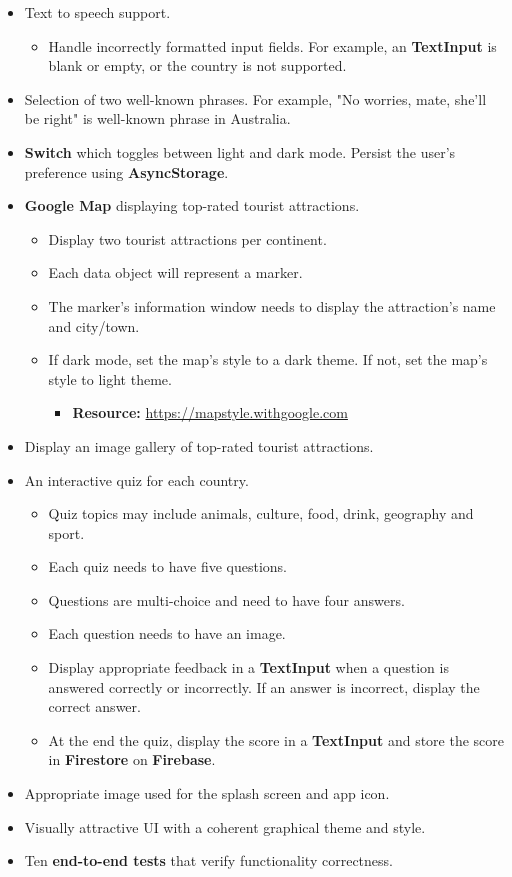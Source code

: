 \documentclass{article}
\begin{document}
\begin{itemize}
\begin{itemize}
		\end{itemize}
	\item Text to speech support.
		\begin{itemize}
			\item Handle incorrectly formatted input fields. For example, an \textbf{TextInput} is blank or empty, or the country is not supported.
		\end{itemize}
	\item Selection of two well-known phrases. For example, "No worries, mate, she'll be right" is well-known phrase in Australia.
	\item \textbf{Switch} which toggles between light and dark mode. Persist the user's preference using \textbf{AsyncStorage}.
	\item \textbf{Google Map} displaying top-rated tourist attractions.
	      \begin{itemize}
		      \item Display two tourist attractions per continent.
		      \item Each data object will represent a marker.
		      \item The marker's information window needs to display the attraction's name and city/town.
		      \item If dark mode, set the map's style to a dark theme. If not, set the map's style to light theme.
				\begin{itemize}
					\item \textbf{Resource:} \small\href{https://mapstyle.withgoogle.com}{https://mapstyle.withgoogle.com}
				\end{itemize}
	      \end{itemize}
	\item Display an image gallery of top-rated tourist attractions.
	\item An interactive quiz for each country.
	\begin{itemize}.
		\item Quiz topics may include animals, culture, food, drink, geography and sport.
		\item Each quiz needs to have five questions.
		\item Questions are multi-choice and need to have four answers.
		\item Each question needs to have an image.
		\item Display appropriate feedback in a \textbf{TextInput} when a question is answered correctly or incorrectly. If an answer is incorrect, display
		 the correct answer.
		\item At the end the quiz, display the score in a \textbf{TextInput} and store the score in \textbf{Firestore} on \textbf{Firebase}.
	\end{itemize}  
	\item Appropriate image used for the splash screen and app icon.
	\item Visually attractive UI with a coherent graphical theme and style.
	\item Ten \textbf{end-to-end tests} that verify functionality correctness.
\end{itemize}
\end{document}
